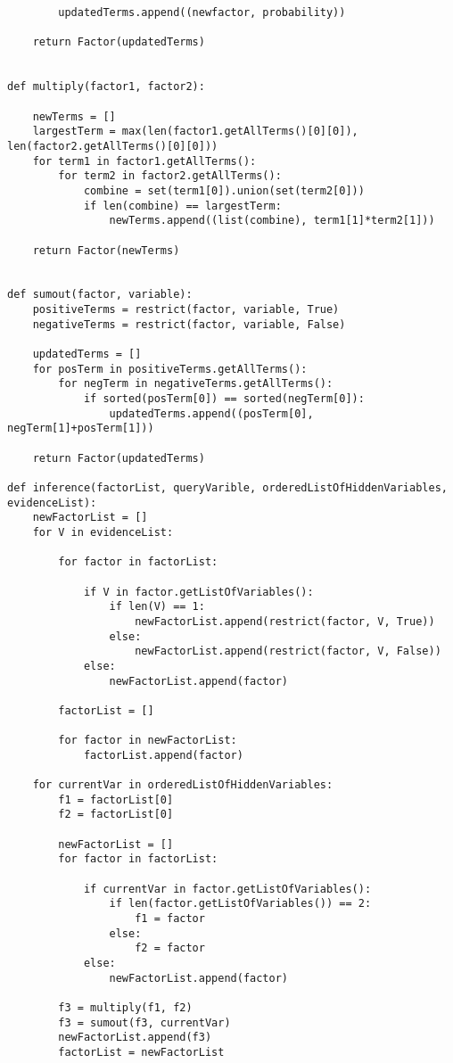 \documentclass{article}
\begin{document}
\begin{titlepage}
\begin{lstlisting}
        updatedTerms.append((newfactor, probability))

    return Factor(updatedTerms)


def multiply(factor1, factor2):

    newTerms = []
    largestTerm = max(len(factor1.getAllTerms()[0][0]), len(factor2.getAllTerms()[0][0]))
    for term1 in factor1.getAllTerms():
        for term2 in factor2.getAllTerms():
            combine = set(term1[0]).union(set(term2[0]))
            if len(combine) == largestTerm:
                newTerms.append((list(combine), term1[1]*term2[1]))

    return Factor(newTerms)


def sumout(factor, variable):
    positiveTerms = restrict(factor, variable, True)
    negativeTerms = restrict(factor, variable, False)

    updatedTerms = []
    for posTerm in positiveTerms.getAllTerms():
        for negTerm in negativeTerms.getAllTerms():
            if sorted(posTerm[0]) == sorted(negTerm[0]):
                updatedTerms.append((posTerm[0], negTerm[1]+posTerm[1]))

    return Factor(updatedTerms)

def inference(factorList, queryVarible, orderedListOfHiddenVariables, evidenceList):
    newFactorList = []
    for V in evidenceList:
        
        for factor in factorList:

            if V in factor.getListOfVariables():
                if len(V) == 1:
                    newFactorList.append(restrict(factor, V, True))
                else:
                    newFactorList.append(restrict(factor, V, False))
            else:
                newFactorList.append(factor)

        factorList = []

        for factor in newFactorList:
            factorList.append(factor)

    for currentVar in orderedListOfHiddenVariables:
        f1 = factorList[0]
        f2 = factorList[0]

        newFactorList = []
        for factor in factorList:

            if currentVar in factor.getListOfVariables():
                if len(factor.getListOfVariables()) == 2:
                    f1 = factor
                else:
                    f2 = factor
            else:
                newFactorList.append(factor)

        f3 = multiply(f1, f2)
        f3 = sumout(f3, currentVar)
        newFactorList.append(f3)
        factorList = newFactorList


\end{lstlisting}
\end{titlepage}
\end{document}
